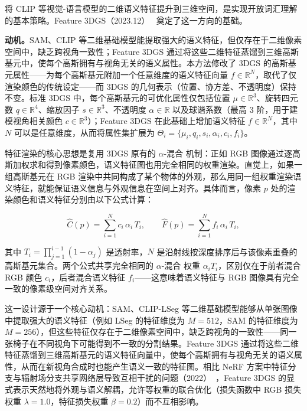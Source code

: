 将 CLIP 等视觉-语言模型的二维语义特征提升到三维空间，是实现开放词汇理解的基本策略。Feature 3DGS（2023.12）~\cite{2312_03203} 奠定了这一方向的基础。

\textbf{动机。}SAM、CLIP 等二维基础模型能提取强大的语义特征，但仅存在于二维像素空间中，缺乏跨视角一致性；Feature 3DGS 通过将这些二维特征蒸馏到三维高斯基元中，使每个高斯拥有与视角无关的语义属性。本方法修改了 3DGS 的高斯基元属性——为每个高斯基元附加一个任意维度的语义特征向量 $f \in \mathbb{R}^N$，取代了仅渲染颜色的传统设定——而 3DGS 的几何表示（位置、协方差、不透明度）保持不变。标准 3DGS 中，每个高斯基元的可优化属性仅包括位置 $\mu \in \mathbb{R}^3$、旋转四元数 $q \in \mathbb{R}^4$、缩放因子 $s \in \mathbb{R}^3$、不透明度 $\alpha \in \mathbb{R}$ 以及球谐系数（最高 3 阶，用于建模视角相关颜色 $c \in \mathbb{R}^3$）；Feature 3DGS 在此基础上增加语义特征 $f \in \mathbb{R}^N$，其中 $N$ 可以是任意维度，从而将属性集扩展为 $\Theta_i = \{\mu_i, q_i, s_i, \alpha_i, c_i, f_i\}$。

特征渲染的核心思想是复用 3DGS 原有的 $\alpha$-混合 机制：正如 RGB 图像通过逐高斯加权求和得到像素颜色，语义特征图也用完全相同的权重渲染。直觉上，如果一组高斯基元在 RGB 渲染中共同构成了某个物体的外观，那么用同一组权重渲染语义特征，就能保证语义信息与外观信息在空间上对齐。具体而言，像素 $p$ 处的渲染颜色和语义特征分别由以下公式计算：

\begin{equation}
\hat{C}(p) = \sum_{i=1}^{N} c_i \, \alpha_i \, T_i, \qquad
\hat{F}(p) = \sum_{i=1}^{N} f_i \, \alpha_i \, T_i,
\end{equation}

其中 $T_i = \prod_{j=1}^{i-1}(1 - \alpha_j)$ 是透射率，$N$ 是沿射线按深度排序后与该像素重叠的高斯基元集合。两个公式共享完全相同的 $\alpha$-混合 权重 $\alpha_i T_i$，区别仅在于前者混合 RGB 颜色 $c_i$，后者混合语义特征 $f_i$——这意味着语义特征与 RGB 图像具有完全一致的像素级空间对齐关系。

这一设计源于一个核心动机：SAM、CLIP-LSeg 等二维基础模型能够从单张图像中提取强大的语义特征（例如 LSeg 的特征维度为 $M=512$，SAM 的特征维度为 $M=256$），但这些特征仅存在于二维像素空间中，缺乏跨视角的一致性——同一张椅子在不同视角下可能得到不一致的分割结果。Feature 3DGS 通过将这些二维特征蒸馏到三维高斯基元的语义特征向量中，使每个高斯拥有与视角无关的语义属性，从而在新视角合成时也能产生语义一致的特征图。相比 NeRF 方案中特征分支与辐射场分支共享网络层导致互相干扰的问题（2022）~\cite{kobayashi2022decomposing}，Feature 3DGS 的显式表示天然地将外观与语义解耦，允许等权重的联合优化（损失函数中 RGB 损失权重 $\lambda=1.0$，特征损失权重 $\beta=0.2$）而不互相影响。

